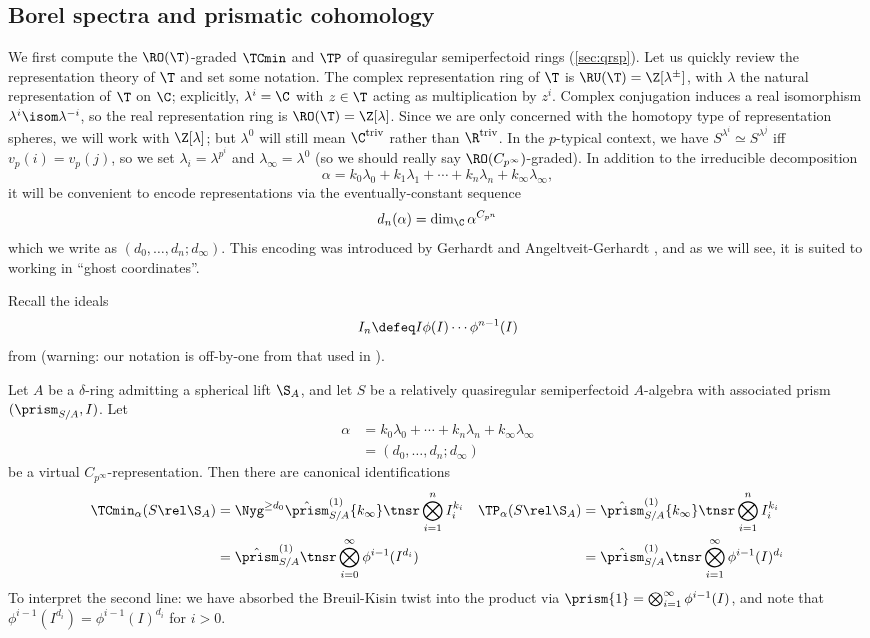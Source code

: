 \subsection{Borel spectra and prismatic cohomology}
We first compute the $\RO(\T)$-graded $\TCmin$ and $\TP$ of quasiregular semiperfectoid rings (\sec\ref{sec:qrsp}). Let us quickly review the representation theory of $\T$ and set some notation. The complex representation ring of $\T$ is $\RU(\T)=\Z[\lambda^\pm]$, with $\lambda$ the natural representation of $\T$ on $\C$; explicitly, $\lambda^i=\C$ with $z\in\T$ acting as multiplication by $z^i$. Complex conjugation induces a real isomorphism $\lambda^i \isom \lambda^{-i}$, so the real representation ring is $\RO(\T)=\Z[\lambda]$. Since we are only concerned with the homotopy type of representation spheres, we will work with $\Z[\lambda]$; but $\lambda^0$ will still mean $\C^{\mathrm{triv}}$ rather than $\R^{\mathrm{triv}}$. In the $p$-typical context, we have $S^{\lambda^i} \simeq S^{\lambda^j}$ iff $v_p(i)=v_p(j)$, so we set $\lambda_i=\lambda^{p^i}$ and $\lambda_\infty=\lambda^0$ (so we should really say $\RO(C_{p^\infty})$-graded). 
In addition to the irreducible decomposition
\[ \alpha = k_0 \lambda_0 + k_1 \lambda_1 + \dotsb + k_n \lambda_n + k_\infty \lambda_\infty, \]
it will be convenient to encode representations via the eventually-constant sequence
\[ d_n(\alpha) = \dim_\C \alpha^{C_{p^n}} \]
which we write as $(d_0,\dotsc,d_n;d_\infty)$. This encoding was introduced by Gerhardt and Angeltveit-Gerhardt \cite{TeenaTR,ROS1TR}, and as we will see, it is suited to working in ``ghost coordinates''.

Recall the ideals
\[ I_n \defeq I\phi(I)\dotsm\phi^{n-1}(I) \]
from \cite[Notation 2.2.2]{APC} (warning: our notation is off-by-one from that used in \cite{PrismsTambara1}).

\begin{theorem}
  \label{thm:qrsp}
  Let $A$ be a $\delta$-ring admitting a spherical lift $\S_A$, and let $S$ be a relatively quasiregular semiperfectoid $A$-algebra with associated prism $(\prism_{S/A},I)$. Let
  \begin{align*}
    \alpha
    &=k_0\lambda_0 + \dotsb + k_n\lambda_n + k_\infty \lambda_\infty\\
    &= (d_0,\dotsc,d_n;d_\infty)
  \end{align*}
  be a virtual $C_{p^\infty}$-representation. Then there are canonical identifications
  \begin{align*}
    \TCmin_\alpha(S\rel\S_A)
      &= \Nyg^{\ge d_0}\hat\prism^{(1)}_{S/A}\{k_\infty\} \tnsr \bigotimes_{i=1}^n I_i^{k_i}
    & \TP_\alpha(S\rel\S_A)
    &= \hat\prism^{(1)}_{S/A}\{k_\infty\} \tnsr \bigotimes_{i=1}^n I_i^{k_i}\\
    &= \hat\prism^{(1)}_{S/A} \tnsr \bigotimes_{i=0}^\infty \phi^{i-1}(I^{d_i})
    &&= \hat\prism^{(1)}_{S/A} \tnsr \bigotimes_{i=1}^\infty \phi^{i-1}(I)^{d_i}
  \end{align*}
  To interpret the second line: we have absorbed the Breuil-Kisin twist into the product via $\prism\{1\} = \bigotimes_{i=1}^\infty \phi^{i-1}(I)$, and note that $\phi^{i-1}(I^{d_i}) = \phi^{i-1}(I)^{d_i}$ for $i>0$.
\end{theorem}

